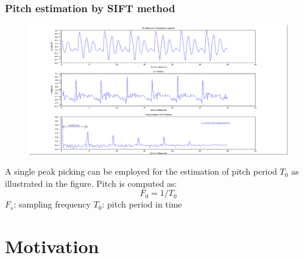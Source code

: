 \documentclass{beamer}
\begin{document}
\begin{frame}
\frametitle{Pitch estimation by SIFT method}
\begin{figure}
\includegraphics[width=0.8\linewidth]{Image/Fig9.png}
\end{figure}
A single peak picking can be employed for the estimation of pitch period $T_0$ as illustrated in the figure. 
Pitch is computed as:\\
\begin{equation}
F_0 = 1 / T_0
\end{equation}
\hspace{10mm} $F_s$: sampling frequency \hspace{10mm} $T_0$: pitch period in time
\end{frame}


\section{Motivation} 
\end{document}

